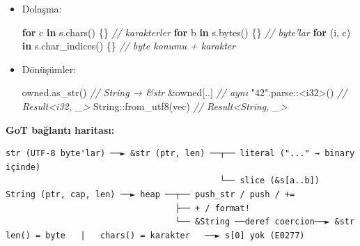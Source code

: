 \documentclass[12pt,a4paper]{article}
\newenvironment{Shaded}{}{}
\newcommand{\CommentTok}[1]{\textcolor[rgb]{0.38,0.63,0.69}{\textit{#1}}}
\newcommand{\ControlFlowTok}[1]{\textcolor[rgb]{0.00,0.44,0.13}{\textbf{#1}}}
\newcommand{\DataTypeTok}[1]{\textcolor[rgb]{0.56,0.13,0.00}{#1}}
\newcommand{\DecValTok}[1]{\textcolor[rgb]{0.25,0.63,0.44}{#1}}
\newcommand{\FunctionTok}[1]{\textcolor[rgb]{0.02,0.16,0.49}{#1}}
\newcommand{\KeywordTok}[1]{\textcolor[rgb]{0.00,0.44,0.13}{\textbf{#1}}}
\newcommand{\NormalTok}[1]{#1}
\newcommand{\OperatorTok}[1]{\textcolor[rgb]{0.40,0.40,0.40}{#1}}
\newcommand{\StringTok}[1]{\textcolor[rgb]{0.25,0.44,0.63}{#1}}
\begin{document}
\begin{itemize}
\begin{Shaded}
\begin{Highlighting}[]
\OperatorTok{\&}\NormalTok{s}\OperatorTok{[}\DecValTok{0}\OperatorTok{..}\DecValTok{2}\OperatorTok{]}          \CommentTok{// "he"}
\end{Highlighting}
\end{Shaded}


  Hata (runtime): \texttt{\&"é"{[}0..1{]}} → panic \texttt{byte\ index\ 1\ is\ not\ a\ char\ boundary}
\item
  Dolaşma:

\begin{Shaded}
\begin{Highlighting}[]
\ControlFlowTok{for}\NormalTok{ c }\KeywordTok{in}\NormalTok{ s}\OperatorTok{.}\FunctionTok{chars}\OperatorTok{()} \OperatorTok{\{\}}               \CommentTok{// karakterler}
\ControlFlowTok{for}\NormalTok{ b }\KeywordTok{in}\NormalTok{ s}\OperatorTok{.}\FunctionTok{bytes}\OperatorTok{()} \OperatorTok{\{\}}               \CommentTok{// byte'lar}
\ControlFlowTok{for} \OperatorTok{(}\NormalTok{i}\OperatorTok{,}\NormalTok{ c}\OperatorTok{)} \KeywordTok{in}\NormalTok{ s}\OperatorTok{.}\FunctionTok{char\_indices}\OperatorTok{()} \OperatorTok{\{\}}   \CommentTok{// byte konumu + karakter}
\end{Highlighting}
\end{Shaded}
\item
  Dönüşümler:

\begin{Shaded}
\begin{Highlighting}[]
\NormalTok{owned}\OperatorTok{.}\FunctionTok{as\_str}\OperatorTok{()}               \CommentTok{// String → \&str}
\OperatorTok{\&}\NormalTok{owned}\OperatorTok{[..]}                   \CommentTok{// aynı}
\StringTok{"42"}\OperatorTok{.}\NormalTok{parse}\OperatorTok{::\textless{}}\DataTypeTok{i32}\OperatorTok{\textgreater{}()}          \CommentTok{// Result\textless{}i32, \_\textgreater{}}
\DataTypeTok{String}\OperatorTok{::}\FunctionTok{from\_utf8}\OperatorTok{(}\NormalTok{vec}\OperatorTok{)}       \CommentTok{// Result\textless{}String, \_\textgreater{}}
\end{Highlighting}
\end{Shaded}
\end{itemize}

\textbf{GoT bağlantı haritası:}

\begin{verbatim}
str (UTF-8 byte'lar) ──► &str (ptr, len) ──┬── literal ("..." → binary içinde)
                                           └── slice (&s[a..b])
String (ptr, cap, len) ──► heap ──┬── push_str / push / +=
                                  ├── + / format!
                                  └── &String ──deref coercion──► &str
len() = byte   |   chars() = karakter   ──► s[0] yok (E0277)
\end{verbatim}
\end{document}
